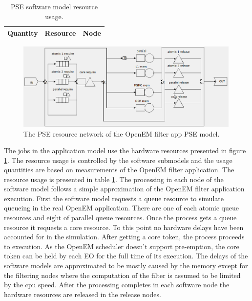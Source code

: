 \begin{table}
    \begin{center}
        \begin{tabular}{| c | c | c |}
            \hline
            Quantity & Resource & Node \\ \hline
        \end{tabular}
        \caption{PSE software model resource usage.}
        \label{tab:pse_resources}
    \end{center}
\end{table}

\begin{figure}[h!]
    \begin{center}
        \includegraphics[width=0.99\textwidth]{images/pse_hardware.png}
        \caption{The PSE resource network of the OpenEM filter app PSE
        model.}
        \label{fig:pse_hardware}
    \end{center}
\end{figure}

The jobs in the application model use the hardware resources presented in figure
\ref{fig:pse_hardware}. The resource usage is controlled by the software
submodels and the usage quantities are based on measurements of the OpenEM
filter application. The resource usage is presented in table
\ref{tab:pse_resources}. The processing in each node of the software model
follows a simple approximation of the OpenEM filter application execution. First
the software model requests a queue resource to simulate queueing in the real
OpenEM application. There are one of each atomic queue resources and eight of
parallel queue resources. Once the process gets a queue resource it requests a
core resource. To this point no hardware delays have been accounted for in the
simulation. After getting a core token, the process proceeds to execution. As
the OpenEM scheduler doesn't support pre-emption, the core token can be held by
each EO for the full time of its execution. The delays of the software models
are approximated to be mostly caused by the memory except for the filtering
nodes where the computation of the filter is assumed to be limited by the cpu
speed. After the processing completes in each software node the hardware
resources are released in the release nodes.
